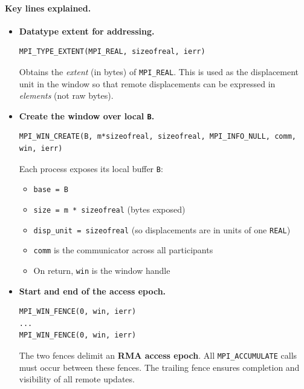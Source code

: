 \documentclass[12pt]{book}
\begin{document}
\paragraph{Key lines explained.}

\begin{itemize}
    \item \textbf{Datatype extent for addressing.}
\begin{lstlisting}[style=cppstyle]
MPI_TYPE_EXTENT(MPI_REAL, sizeofreal, ierr)
\end{lstlisting}
Obtains the \emph{extent} (in bytes) of \texttt{MPI\_REAL}. This is used as the displacement unit in the window so that remote displacements can be expressed in \emph{elements} (not raw bytes).

    \item \textbf{Create the window over local \texttt{B}.}
\begin{lstlisting}[style=cppstyle]
MPI_WIN_CREATE(B, m*sizeofreal, sizeofreal, MPI_INFO_NULL, comm, win, ierr)
\end{lstlisting}
Each process exposes its local buffer \texttt{B}:
\begin{itemize}
    \item \texttt{base = B}
    \item \texttt{size = m * sizeofreal} (bytes exposed)
    \item \texttt{disp\_unit = sizeofreal} (so displacements are in units of one \texttt{REAL})
    \item \texttt{comm} is the communicator across all participants
    \item On return, \texttt{win} is the window handle
\end{itemize}

    \item \textbf{Start and end of the access epoch.}
\begin{lstlisting}[style=cppstyle]
MPI_WIN_FENCE(0, win, ierr)
...
MPI_WIN_FENCE(0, win, ierr)
\end{lstlisting}
The two fences delimit an \textbf{RMA access epoch}. All \texttt{MPI\_ACCUMULATE} calls must occur between these fences. The trailing fence ensures completion and visibility of all remote updates.


\end{itemize}
\end{document}
